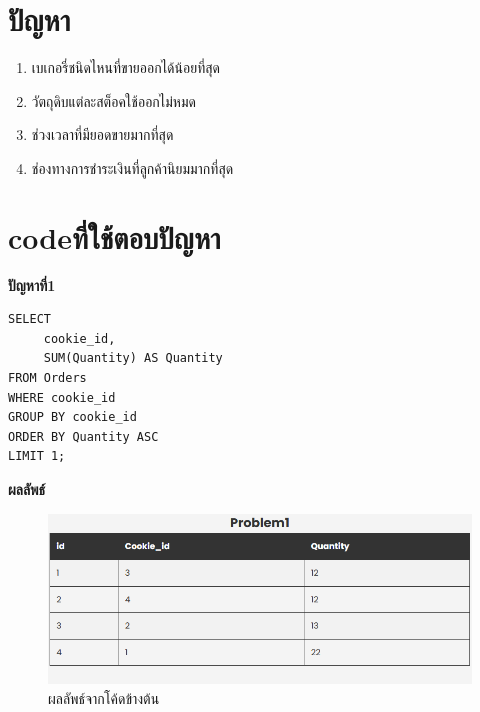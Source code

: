 \documentclass{report}
\begin{document}
\section{ปัญหา}
\begin{enumerate}
	\item เบเกอรี่ชนิดไหนที่ขายออกได้น้อยที่สุด
	\item วัตถุดิบแต่ละสต็อคใช้ออกไม่หมด
	\item ช่วงเวลาที่มียอดขายมากที่สุด
	\item ช่องทางการชำระเงินที่ลูกค้านิยมมากที่สุด
\end{enumerate}

\section{codeที่ใช้ตอบปัญหา}

\textbf{ปัญหาที่1} 
\begin{verbatim}
SELECT
	 cookie_id,
	 SUM(Quantity) AS Quantity
FROM Orders 
WHERE cookie_id
GROUP BY cookie_id
ORDER BY Quantity ASC
LIMIT 1;  
\end{verbatim}
\textbf{ผลลัพธ์}
\raggedright\begin{figure}[!ht]
    \centering
    \includegraphics[scale=0.55]{q1.png}
    \caption{ผลลัพธ์จากโค้ดข้างต้น} 
\label{fig:mesh1}
\end{figure} 
\end{document}

